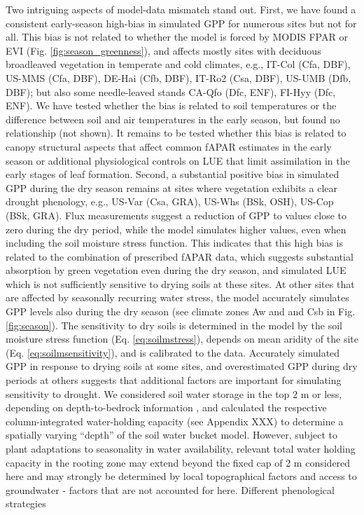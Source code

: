\documentclass{myreport}
\begin{document}
Two intriguing aspects of model-data mismatch stand out. First, we have found a consistent early-season high-bias in simulated GPP for numerous sites but not for all. This bias is not related to whether the model is forced by MODIS FPAR or EVI (Fig. \ref{fig:season_greenness}), and affects mostly sites with deciduous broadleaved vegetation in temperate and cold climates, e.g., IT-Col (Cfa, DBF), US-MMS (Cfa, DBF), DE-Hai (Cfb, DBF), IT-Ro2 (Csa, DBF), US-UMB (Dfb, DBF); but also some needle-leaved stands CA-Qfo (Dfc, ENF), FI-Hyy (Dfc, ENF). We have tested whether the bias is related to soil temperatures or the difference between soil and air temperatures in the early season, but found no relationship (not shown). It remains to be tested whether this bias is related to canopy structural aspects that affect common fAPAR estimates in the early season or additional physiological controls on LUE that limit assimilation in the early stages of leaf formation. Second, a substantial positive bias in simulated GPP during the dry season remains at sites where vegetation exhibits a clear drought phenology, e.g., US-Var (Csa, GRA), US-Whs (BSk, OSH), US-Cop (BSk, GRA). Flux measurements suggest a reduction of GPP to values close to zero during the dry period, while the model simulates higher values, even when including the soil moisture stress function. This indicates that this high bias is related to the combination of prescribed fAPAR data, which suggests substantial absorption by green vegetation even during the dry season, and simulated LUE which is not sufficiently sensitive to drying soils at these sites. At other sites that are affected by seasonally recurring water stress, the model accurately simulates GPP levels also during the dry season (see climate zones Aw and and Csb in Fig. \ref{fig:season}). The sensitivity to dry soils is determined in the model by the soil moisture stress function (Eq. \ref{eq:soilmstress}), depends on mean aridity of the site (Eq. \ref{eq:soilmsensitivity}), and is calibrated to the data. Accurately simulated GPP in response to drying soils at some sites, and overestimated GPP during dry periods at others suggests that additional factors are important for simulating sensitivity to drought. We considered soil water storage in the top 2 m or less, depending on depth-to-bedrock information \citep{Hengl2014-jm}, and calculated the respective column-integrated water-holding capacity (see Appendix XXX) to determine a spatially varying ``depth'' of the soil water bucket model. However, subject to plant adaptations to seasonality in water availability, relevant total water holding capacity in the rooting zone may extend beyond the fixed cap of 2 m considered here \citep{yang16wrr} and may strongly be determined by local topographical factors and access to groundwater \citep{fan13sci, fan17pnas} - factors that are not accounted for here. Different phenological strategies 
\end{document}
